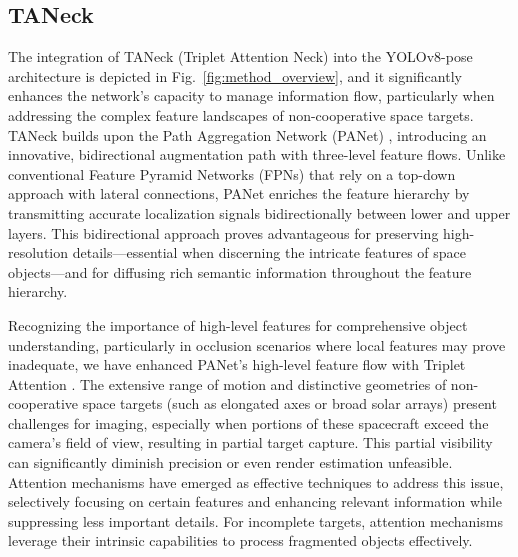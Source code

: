 \documentclass[a4paper,fleqn]{cas-sc}
\begin{document}
\subsection{TANeck}
The integration of TANeck (Triplet Attention Neck) into the YOLOv8-pose architecture is depicted in Fig.~\ref{fig:method_overview}, and it significantly enhances the network's capacity to manage information flow, particularly when addressing the complex feature landscapes of non-cooperative space targets. TANeck builds upon the Path Aggregation Network (PANet) \citep{panet}, introducing an innovative, bidirectional augmentation path with three-level feature flows. Unlike conventional Feature Pyramid Networks (FPNs) \citep{fpn} that rely on a top-down approach with lateral connections, PANet enriches the feature hierarchy by transmitting accurate localization signals bidirectionally between lower and upper layers. This bidirectional approach proves advantageous for preserving high-resolution details—essential when discerning the intricate features of space objects—and for diffusing rich semantic information throughout the feature hierarchy.

Recognizing the importance of high-level features for comprehensive object understanding, particularly in occlusion scenarios where local features may prove inadequate, we have enhanced PANet's high-level feature flow with Triplet Attention \citep{triplet}. The extensive range of motion and distinctive geometries of non-cooperative space targets (such as elongated axes or broad solar arrays) present challenges for imaging, especially when portions of these spacecraft exceed the camera's field of view, resulting in partial target capture. This partial visibility can significantly diminish precision or even render estimation unfeasible. Attention mechanisms have emerged as effective techniques to address this issue, selectively focusing on certain features and enhancing relevant information while suppressing less important details. For incomplete targets, attention mechanisms leverage their intrinsic capabilities to process fragmented objects effectively.
\end{document}
